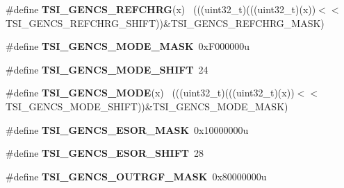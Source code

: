 \begin{DoxyCompactItemize}
\item 
\hypertarget{group___t_s_i___register___masks_gafa86002397a847f601ec063b2a455c8a}{}\#define {\bfseries T\+S\+I\+\_\+\+G\+E\+N\+C\+S\+\_\+\+R\+E\+F\+C\+H\+R\+G}(x)                                      ~(((uint32\+\_\+t)(((uint32\+\_\+t)(x))$<$$<$T\+S\+I\+\_\+\+G\+E\+N\+C\+S\+\_\+\+R\+E\+F\+C\+H\+R\+G\+\_\+\+S\+H\+I\+F\+T))\&T\+S\+I\+\_\+\+G\+E\+N\+C\+S\+\_\+\+R\+E\+F\+C\+H\+R\+G\+\_\+\+M\+A\+S\+K)\label{group___t_s_i___register___masks_gafa86002397a847f601ec063b2a455c8a}

\item 
\hypertarget{group___t_s_i___register___masks_gab587591eee9153b51aca25177a129404}{}\#define {\bfseries T\+S\+I\+\_\+\+G\+E\+N\+C\+S\+\_\+\+M\+O\+D\+E\+\_\+\+M\+A\+S\+K}~0x\+F000000u\label{group___t_s_i___register___masks_gab587591eee9153b51aca25177a129404}

\item 
\hypertarget{group___t_s_i___register___masks_ga4958dbdc98f77bad2618b035d3d89112}{}\#define {\bfseries T\+S\+I\+\_\+\+G\+E\+N\+C\+S\+\_\+\+M\+O\+D\+E\+\_\+\+S\+H\+I\+F\+T}~24\label{group___t_s_i___register___masks_ga4958dbdc98f77bad2618b035d3d89112}

\item 
\hypertarget{group___t_s_i___register___masks_gaee1e82e680337303dfee7f8c59f45692}{}\#define {\bfseries T\+S\+I\+\_\+\+G\+E\+N\+C\+S\+\_\+\+M\+O\+D\+E}(x)                                            ~(((uint32\+\_\+t)(((uint32\+\_\+t)(x))$<$$<$T\+S\+I\+\_\+\+G\+E\+N\+C\+S\+\_\+\+M\+O\+D\+E\+\_\+\+S\+H\+I\+F\+T))\&T\+S\+I\+\_\+\+G\+E\+N\+C\+S\+\_\+\+M\+O\+D\+E\+\_\+\+M\+A\+S\+K)\label{group___t_s_i___register___masks_gaee1e82e680337303dfee7f8c59f45692}

\item 
\hypertarget{group___t_s_i___register___masks_ga1036a1740b9fd85ac9a7ee8c7b31fbc5}{}\#define {\bfseries T\+S\+I\+\_\+\+G\+E\+N\+C\+S\+\_\+\+E\+S\+O\+R\+\_\+\+M\+A\+S\+K}~0x10000000u\label{group___t_s_i___register___masks_ga1036a1740b9fd85ac9a7ee8c7b31fbc5}

\item 
\hypertarget{group___t_s_i___register___masks_ga2cdb34b848a822afc459c74893200fbb}{}\#define {\bfseries T\+S\+I\+\_\+\+G\+E\+N\+C\+S\+\_\+\+E\+S\+O\+R\+\_\+\+S\+H\+I\+F\+T}~28\label{group___t_s_i___register___masks_ga2cdb34b848a822afc459c74893200fbb}

\item 
\hypertarget{group___t_s_i___register___masks_gae0670e2e8c0eb55717171acb5a2bebfe}{}\#define {\bfseries T\+S\+I\+\_\+\+G\+E\+N\+C\+S\+\_\+\+O\+U\+T\+R\+G\+F\+\_\+\+M\+A\+S\+K}~0x80000000u\label{group___t_s_i___register___masks_gae0670e2e8c0eb55717171acb5a2bebfe}


\end{DoxyCompactItemize}
